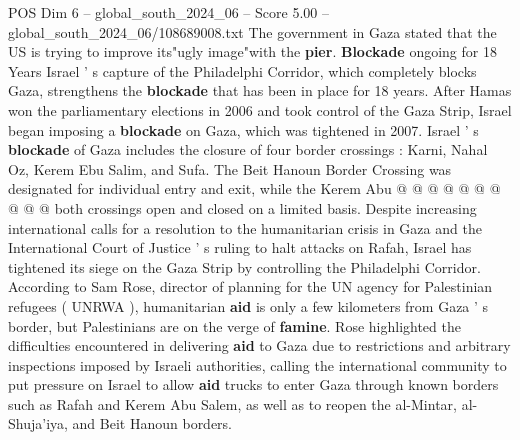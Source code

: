 \begin{textsample}{POS Dim 6 – global\_south\_2024\_06 – Score 5.00 – global\_south\_2024\_06/108689008.txt}
The government in Gaza stated that the US is trying to improve its"ugly image"with the \textbf{pier}. \textbf{Blockade} ongoing for 18 Years Israel ' s capture of the Philadelphi Corridor, which completely blocks Gaza, strengthens the \textbf{blockade} that has been in place for 18 years.
After Hamas won the parliamentary elections in 2006 and took control of the Gaza Strip, Israel began imposing a \textbf{blockade} on Gaza, which was tightened in 2007.
Israel ' s \textbf{blockade} of Gaza includes the closure of four border crossings : Karni, Nahal Oz, Kerem Ebu Salim, and Sufa.
The Beit Hanoun Border Crossing was designated for individual entry and exit, while the Kerem Abu @ @ @ @ @ @ @ @ @ @ both crossings open and closed on a limited basis.
Despite increasing international calls for a resolution to the humanitarian crisis in Gaza and the International Court of Justice ' s ruling to halt attacks on Rafah, Israel has tightened its siege on the Gaza Strip by controlling the Philadelphi Corridor.
According to Sam Rose, director of planning for the UN agency for Palestinian refugees ( UNRWA ), humanitarian \textbf{aid} is only a few kilometers from Gaza ' s border, but Palestinians are on the verge of \textbf{famine}.
Rose highlighted the difficulties encountered in delivering \textbf{aid} to Gaza due to restrictions and arbitrary inspections imposed by Israeli authorities, calling the international community to put pressure on Israel to allow \textbf{aid} trucks to enter Gaza through known borders such as Rafah and Kerem Abu Salem, as well as to reopen the al-Mintar, al-Shuja'iya, and Beit Hanoun borders.

\end{textsample}
